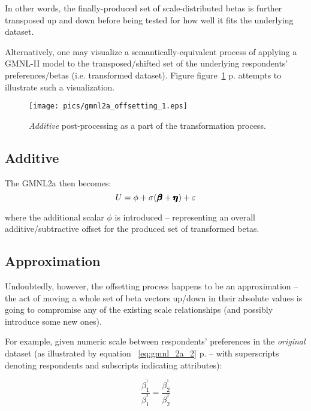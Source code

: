 \documentclass[12pt,a4paper]{article}
\begin{document}
In other words, the finally-produced set of scale-distributed betas is further transposed up and down before being tested for how well it fits the underlying dataset. 

Alternatively, one may visualize a semantically-equivalent process of applying a GMNL-II model to the transposed/shifted set of the underlying respondents' preferences/betas  (i.e. transformed dataset). Figure figure~\ref{fig:gmnl2a_offsetting_1} p.\pageref{fig:gmnl2a_offsetting_1} attempts to illustrate such a visualization.

\begin{figure}[H]
\begin{framed}
\texttt{[image: pics/gmnl2a\_offsetting\_1.eps]}
\caption{\textit{Additive} post-processing as a part of the transformation process.} 
\label{fig:gmnl2a_offsetting_1}
\end{framed}
\end{figure}

\subsection{Additive}

The GMNL2a then becomes:
{ \Large 
\begin{equation}
\label{eq:gmnl_2a_1}
U=\phi + \sigma(\pmb{\hm{\beta}}+\pmb{\hm{\eta}}) + \varepsilon
\end{equation}
}

where the additional scalar \(\phi\) is introduced -- representing an overall additive/subtractive offset for the produced set of transformed betas. 

\subsection{Approximation}

Undoubtedly, however, the offsetting process happens to be an approximation -- the act of moving a whole set of beta vectors up/down in their absolute values is going to compromise any of the existing scale relationships (and possibly introduce some new ones).

For example, given numeric scale between respondents' preferences in the \textit{original} dataset (as illustrated by equation ~\ref{eq:gmnl_2a_2} p.\pageref{eq:gmnl_2a_2} -- with superscripts denoting respondents and subscripts indicating attributes):

{ \Large 
\begin{equation}
\label{eq:gmnl_2a_2}
\frac{\beta^{^1}_{1}}{\beta^{^2}_{1}}=\frac{\beta^{^1}_{2}}{\beta^{^2}_{2}}
\end{equation}
}
\end{document}
